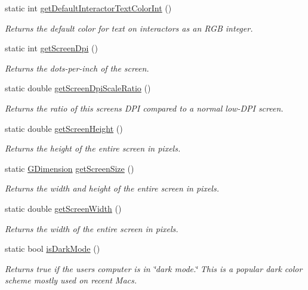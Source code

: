 \begin{DoxyCompactItemize}
static int \mbox{\hyperlink{classsgl_1_1GWindow_a66c284abc8a53870127d079f904489c5}{get\+Default\+Interactor\+Text\+Color\+Int}} ()
\begin{DoxyCompactList}\small\item\em Returns the default color for text on interactors as an R\+GB integer. \end{DoxyCompactList}\item 
static int \mbox{\hyperlink{classsgl_1_1GWindow_aea783b75281f864f14e958d2fee28f9d}{get\+Screen\+Dpi}} ()
\begin{DoxyCompactList}\small\item\em Returns the dots-\/per-\/inch of the screen. \end{DoxyCompactList}\item 
static double \mbox{\hyperlink{classsgl_1_1GWindow_ab15179b683630109f0ac256590a3b323}{get\+Screen\+Dpi\+Scale\+Ratio}} ()
\begin{DoxyCompactList}\small\item\em Returns the ratio of this screen\textquotesingle{}s D\+PI compared to a normal low-\/\+D\+PI screen. \end{DoxyCompactList}\item 
static double \mbox{\hyperlink{classsgl_1_1GWindow_a9942379fdf4fb4445c35eaf3390b7ccb}{get\+Screen\+Height}} ()
\begin{DoxyCompactList}\small\item\em Returns the height of the entire screen in pixels. \end{DoxyCompactList}\item 
static \mbox{\hyperlink{structsgl_1_1GDimension}{G\+Dimension}} \mbox{\hyperlink{classsgl_1_1GWindow_ae3d08d5cde8163274459797770596809}{get\+Screen\+Size}} ()
\begin{DoxyCompactList}\small\item\em Returns the width and height of the entire screen in pixels. \end{DoxyCompactList}\item 
static double \mbox{\hyperlink{classsgl_1_1GWindow_adc82933bd579ab83d7cd4e3bc5f79a12}{get\+Screen\+Width}} ()
\begin{DoxyCompactList}\small\item\em Returns the width of the entire screen in pixels. \end{DoxyCompactList}\item 
static bool \mbox{\hyperlink{classsgl_1_1GWindow_a36044a6efa9c4e015378e56c3e37181d}{is\+Dark\+Mode}} ()
\begin{DoxyCompactList}\small\item\em Returns true if the user\textquotesingle{}s computer is in \char`\"{}dark mode.\char`\"{} This is a popular dark color scheme mostly used on recent Macs. \end{DoxyCompactList}\item 

\end{DoxyCompactItemize}
